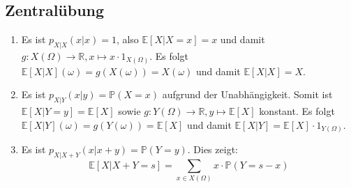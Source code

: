\documentclass[a4paper]{article}
\begin{document}
\makeexheaderger

\subsection{Zentralübung}

\begin{enumerate}
    \item Es ist $p_{X|X}(x|x) = 1$, also $\mathds{E}[X|X=x] = x$ und damit $g: X(\Omega) \to \mathds{R}, x \mapsto x \cdot 1_{X(\Omega)}$. Es folgt $\mathds{E}[X|X](\omega) = g(X(\omega)) = X(\omega)$ und damit $\mathds{E}[X|X] = X$.
    \item Es ist $p_{X|Y}(x|y) = \mathds{P}(X = x)$ aufgrund der Unabhängigkeit. Somit ist $\mathds{E}[X|Y=y] = \mathds{E}[X]$ sowie $g: Y(\Omega) \to \mathds{R}, y \mapsto \mathds{E}[X]$ konstant. Es folgt $\mathds{E}[X|Y](\omega) = g(Y(\omega)) = \mathds{E}[X]$ und damit $\mathds{E}[X|Y] = \mathds{E}[X] \cdot 1_{Y(\Omega)}$.
    \item Es ist $p_{X|X+Y}(x|x+y) = \mathds{P}(Y = y)$. Dies zeigt:
    \begin{equation*}
        \mathds{E}[X|X+Y=s] = \sum_{x \in X(\Omega)} x \cdot \mathds{P}(Y = s - x)
    \end{equation*} 
\end{enumerate}
\end{document}

